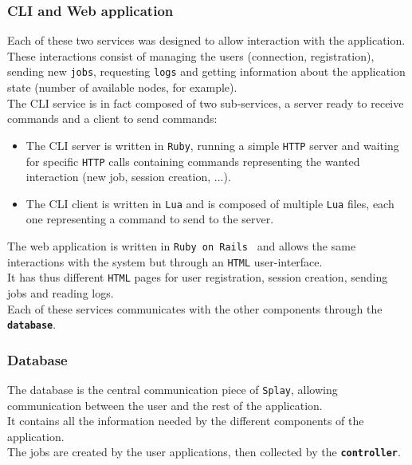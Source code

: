 \documentclass{eplmastersthesis}
\begin{document}
        \subsubsection{CLI and Web application}

          Each of these two services was designed to allow interaction
          with the application. These interactions consist of managing the users
          (connection, registration), sending new \texttt{jobs},
          requesting \texttt{logs} and getting information
          about the application state (number of available nodes, for example).\\

          The CLI service is in fact composed of two sub-services, a server
          ready to receive commands and a client to send commands:
          \begin{itemize}
            \item The CLI server is written in \texttt{Ruby}, running a simple
            \texttt{HTTP} server and waiting for specific \texttt{HTTP} calls containing
            commands representing the wanted interaction (new job, session
            creation, ...).
            \item The CLI client is written in \texttt{Lua} and is composed of
            multiple \texttt{Lua} files, each one representing a command to send
            to the server.
          \end{itemize}

          The web application is written in \texttt{Ruby on Rails}~\cite{ror} and
          allows the same interactions with the system but through
          an \texttt{HTML} user-interface.\\
          It has thus different \texttt{HTML} pages for user registration, session
          creation, sending jobs and reading logs.\\

          Each of these services communicates with the other components
          through the \textbf{\texttt{database}}.

        \subsubsection{Database}

          The database is the central communication piece of \texttt{Splay},
          allowing communication between the user and the rest of the
          application.\\
          It contains all the information needed by the different components
          of the application.\\
          The jobs are created by the user applications, then collected by the
          \textbf{\texttt{controller}}.\\
\end{document}
